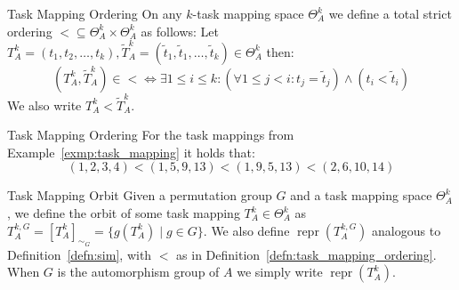 \begin{defn}[label=defn:task_mapping_ordering]{Task Mapping Ordering}
  On any $k$-task mapping space $\Theta_A^k$ we define a total strict ordering
  $\operatorname{<} \subseteq \Theta_A^k \times \Theta_A^k$ as follows:
  Let $T_A^k = (t_1, t_2, \dots, t_k), \widetilde{T}_A^k = (\widetilde{t}_1,
  \widetilde{t}_1, \dots, \widetilde{t}_k) \in \Theta_A^k$ then:
  \begin{equation*}
    (T_A^k, \widetilde{T}_A^k) \in \operatorname{<}
      \Leftrightarrow
    \exists 1 \leq i \leq k:
      (\forall 1 \leq j < i: t_j = \widetilde{t}_j) \land (t_i < \widetilde{t}_i)
  \end{equation*}
  We also write $T_A^k < \widetilde{T}_A^k$.
\end{defn}

\begin{exmp}{Task Mapping Ordering}
  For the task mappings from Example~\ref{exmp:task_mapping} it holds that:
  \begin{equation*}
    (1,2,3,4) < (1,5,9,13) < (1,9,5,13) < (2,6,10,14)
  \end{equation*}
\end{exmp}

\begin{defn}[label=exmp:task_mapping_orbit]{Task Mapping Orbit}
  Given a permutation group $G$ and a task mapping space $\Theta_A^k$, we
  define the orbit of some task mapping $T_A^k \in \Theta_A^k$ as $T_A^{k,G} =
  [T_A^k]_{\sim_G} = \{g(T_A^k) \mid g \in G\}$. We also define
  $\operatorname{repr}(T_A^{k,G})$ analogous to Definition~\ref{defn:sim}, with
  $<$ as in Definition~\ref{defn:task_mapping_ordering}. When $G$ is the
  automorphism group of $A$ we simply write $\operatorname{repr}(T_A^k)$.
\end{defn}

